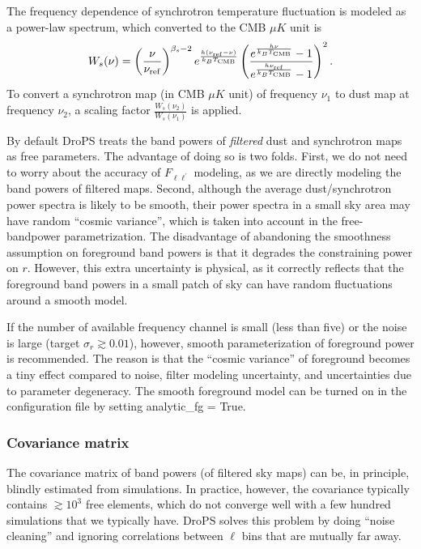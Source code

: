 \documentclass[12pt, a4paper]{ctexart} %
\begin{document}
The frequency dependence of synchrotron temperature fluctuation is modeled as a power-law spectrum, which converted to the CMB $\mu K$ unit is
\begin{equation}
  W_s(\nu) = \left(\frac{\nu}{\nu_{\rm ref}}\right)^{\beta_s-2}e^{\frac{h(\nu_{\rm ref} - \nu)}{k_BT_{\rm CMB}}}\left(\frac{e^{\frac{h\nu}{k_BT_{\rm CMB}}}-1}{e^{\frac{h\nu_{\rm ref}}{k_BT_{\rm CMB}}}-1}\right)^2. \label{eq:sync_w}
\end{equation}
To convert a synchrotron map (in CMB $\mu K$ unit) of frequency $\nu_1$ to dust map at frequency $\nu_2$, a scaling factor $\frac{W_s(\nu_2)}{W_s(\nu_1)}$ is applied.

By default DroPS treats the band powers of {\it filtered} dust and synchrotron maps as free parameters. The advantage of doing so is two folds. First, we do not need to worry about the accuracy of $F_{\ell\ell^\prime}$ modeling, as we are directly modeling the band powers of filtered maps. Second, although the average dust/synchrotron power spectra is likely to be smooth, their power spectra in a small sky area may have random ``cosmic variance'', which is taken into account in the free-bandpower parametrization. The disadvantage of abandoning the smoothness assumption on foreground band powers is that it degrades the constraining power on $r$. However, this extra uncertainty is physical, as it correctly reflects that the foreground band powers in a small patch of sky can have random fluctuations around a smooth model.

If the number of available frequency channel is small (less than five) or the noise is large (target $\sigma_r\gtrsim 0.01$), however, smooth parameterization of foreground power is recommended. The reason is that the ``cosmic variance'' of foreground becomes a tiny effect compared to noise, filter modeling uncertainty, and uncertainties due to parameter degeneracy. The smooth foreground model can be turned on in the configuration file by setting analytic\_fg = True.

\subsubsection{Covariance matrix}

The covariance matrix of band powers (of filtered sky maps) can be, in principle, blindly estimated from simulations. In practice, however, the covariance typically contains $\gtrsim 10^3$ free elements, which do not converge well with a few hundred simulations that we typically have. DroPS solves this problem by doing ``noise cleaning'' and ignoring correlations between $\ell$ bins that are mutually far away.
\end{document}
